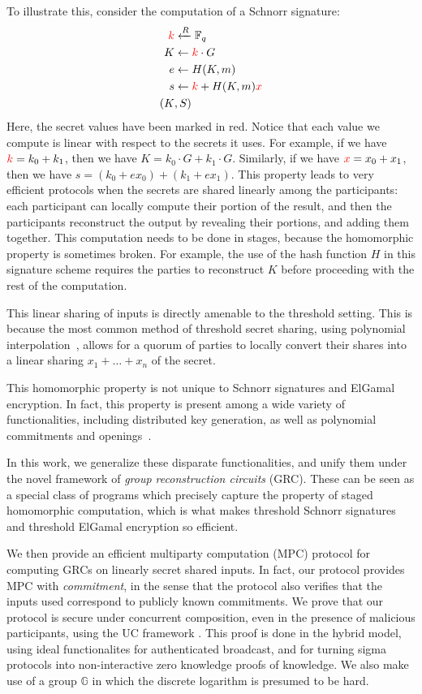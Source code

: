 To illustrate this, consider the computation of a Schnorr signature:
$$
\begin{aligned}
\textcolor{red}{k} &\xleftarrow{R} \mathbb{F}_q\\
K &\gets \textcolor{red}{k} \cdot G\\
e &\gets H(K, m)\\
s &\gets \textcolor{red}{k} + H(K, m)\textcolor{red}{x}\\
(K&, S)
\end{aligned}
$$
Here, the secret values have been marked in red.
Notice that each value we compute is linear with respect
to the secrets it uses.
For example, if we have $\textcolor{red}{k} = k_0 + k_1$,
then we have $K = k_0 \cdot G + k_1 \cdot G$.
Similarly, if we have $\textcolor{red}{x} = x_0 + x_1$, then
we have $s = (k_0 + e x_0) + (k_1 + e x_1)$.
This property leads to very efficient protocols when the
secrets are shared linearly among the participants:
each participant can locally compute their portion of the result,
and then the participants reconstruct the output by revealing
their portions, and adding them together.
This computation needs to be done in stages, because the
homomorphic property is sometimes broken.
For example, the use of the hash function $H$ in this signature
scheme requires the parties to reconstruct $K$ before proceeding
with the rest of the computation.

This linear sharing of inputs is directly amenable to the threshold
setting.
This is because
the most common method of threshold secret sharing,
using polynomial interpolation~\cite{shamir1979share},
allows for a quorum of parties to locally convert their shares
into a linear sharing $x_1 + \ldots + x_n$ of the secret.

This homomorphic property is not unique to Schnorr signatures
and ElGamal encryption.
In fact, this property is present among a wide variety
of functionalities, including distributed key generation,
as well as polynomial commitments and openings~\cite{kate_constant-size_2010}.

In this work, we generalize these disparate functionalities,
and unify them under the novel framework of
\emph{group reconstruction circuits} (GRC).
These can be seen as a special class of programs which precisely
capture the property of staged homomorphic computation,
which is what makes threshold Schnorr signatures and
threshold ElGamal encryption so efficient.

We then provide an efficient multiparty computation (MPC) protocol
for computing GRCs on linearly secret shared inputs.
In fact, our protocol provides MPC with \emph{commitment},
in the sense that the protocol also verifies that the inputs
used correspond to publicly known commitments.
We prove that our protocol is secure under concurrent composition,
even in the presence of malicious participants,
using the UC framework \cite{canetti2001universally}.
This proof is done in the hybrid model,
using ideal functionalites for authenticated broadcast,
and for turning sigma protocols into non-interactive zero knowledge
proofs of knowledge.
We also make use of a group $\mathbb{G}$ in which the discrete
logarithm is presumed to be hard.

